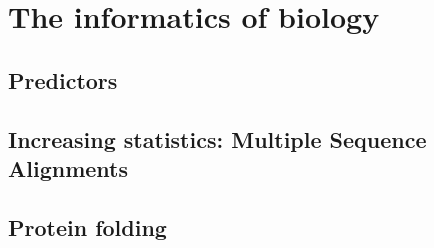 \chapter{The informatics of biology}


\section{Predictors}

\section[Multiple Sequence Alignments]{Increasing statistics: Multiple Sequence Alignments}

\section{Protein folding}
